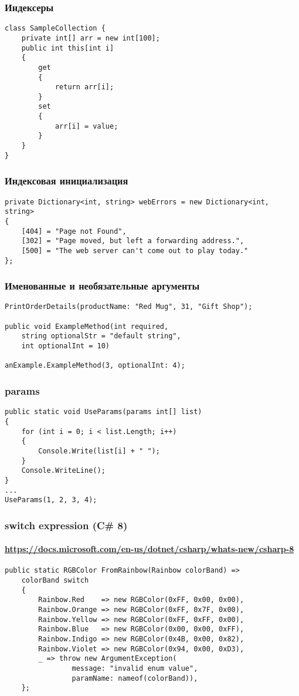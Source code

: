 \documentclass[xetex,mathserif,serif]{beamer}
\begin{document}
    \begin{frame}[fragile]
        \frametitle{Индексеры}
        \begin{verbatim}
class SampleCollection {
    private int[] arr = new int[100];
    public int this[int i]
    {
        get
        {
            return arr[i];
        }
        set
        {
            arr[i] = value;
        }
    }
}
        \end{verbatim}
    \end{frame}

    \begin{frame}[fragile]
        \frametitle{Индексовая инициализация}
        \begin{verbatim}
private Dictionary<int, string> webErrors = new Dictionary<int, string>
{
    [404] = "Page not Found",
    [302] = "Page moved, but left a forwarding address.",
    [500] = "The web server can't come out to play today."
};
        \end{verbatim}
    \end{frame}

    \begin{frame}[fragile]
        \frametitle{Именованные и необязательные аргументы}
        \begin{verbatim}
PrintOrderDetails(productName: "Red Mug", 31, "Gift Shop");

public void ExampleMethod(int required, 
    string optionalStr = "default string",
    int optionalInt = 10)

anExample.ExampleMethod(3, optionalInt: 4);
        \end{verbatim}
    \end{frame}

    \begin{frame}[fragile]
        \frametitle{params}
        \begin{verbatim}
public static void UseParams(params int[] list)
{
    for (int i = 0; i < list.Length; i++)
    {
        Console.Write(list[i] + " ");
    }
    Console.WriteLine();
}
...
UseParams(1, 2, 3, 4);
        \end{verbatim}
    \end{frame}

    \begin{frame}[fragile]
        \frametitle{switch expression (C\# 8)}
        \framesubtitle{\url{https://docs.microsoft.com/en-us/dotnet/csharp/whats-new/csharp-8}}
        \begin{verbatim}
public static RGBColor FromRainbow(Rainbow colorBand) =>
    colorBand switch
    {
        Rainbow.Red    => new RGBColor(0xFF, 0x00, 0x00),
        Rainbow.Orange => new RGBColor(0xFF, 0x7F, 0x00),
        Rainbow.Yellow => new RGBColor(0xFF, 0xFF, 0x00),
        Rainbow.Blue   => new RGBColor(0x00, 0x00, 0xFF),
        Rainbow.Indigo => new RGBColor(0x4B, 0x00, 0x82),
        Rainbow.Violet => new RGBColor(0x94, 0x00, 0xD3),
        _ => throw new ArgumentException(
                message: "invalid enum value", 
                paramName: nameof(colorBand)),
    };
        \end{verbatim}
    \end{frame}
\end{document}
